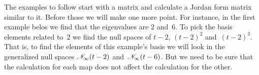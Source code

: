 
The examples to follow start with a matrix and calculate 
a Jordan form matrix similar to it.
Before those we will make one more point.
For instance, in the first example belos we find that the eigenvalues are $2$ 
and~$6$. 
To pick the basis elements related to~\( 2\) we find the null spaces of 
$t-2$, \( (t-2)^2 \) and~\( (t-2)^3\). 
That is, to find the elements of this example's basis we will
look in the generalized null spaces $\mathscr{N}_\infty(t-2)$ 
and~$\mathscr{N}_\infty(t-6)$.
But we need to be sure that the calculation for each map does not 
affect the calculation for the other.



